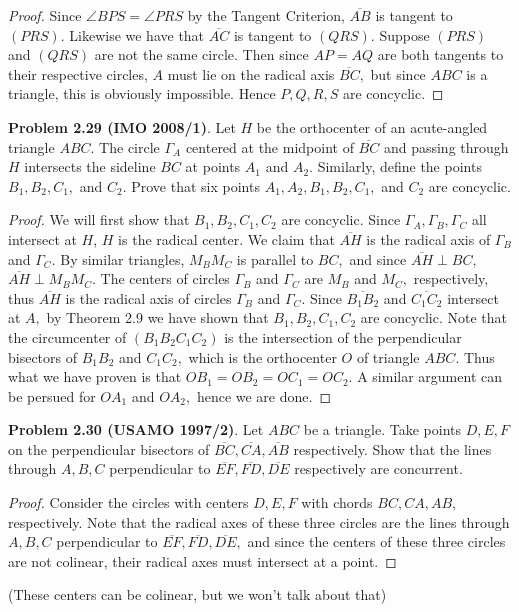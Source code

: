 \documentclass[letterpaper,oneside]{book}
\begin{document}
  \begin{proof}  Since $\angle BPS = \angle PRS$ by the Tangent Criterion, $\overline{AB}$ is tangent to $(PRS).$ Likewise we have that $\overline{AC}$ is tangent to $(QRS).$ Suppose $(PRS)$ and $(QRS)$ are not the same circle. Then since $AP=AQ$ are both tangents to their respective circles, $A$ must lie on the radical axis $\overline{BC},$ but since $ABC$ is a triangle, this is obviously impossible. Hence $P,Q,R,S$ are concyclic. \end{proof}

  

  \textbf{Problem 2.29 (IMO 2008/1)}.   Let $H$ be the orthocenter of an acute-angled triangle $ABC.$ The circle $\Gamma_A$ centered at the midpoint of $\overline{BC}$ and passing through $H$ intersects the sideline $BC$ at points $A_1$ and $A_2.$ Similarly, define the points $B_1, B_2, C_1,$ and $C_2.$ Prove that six points $A_1, A_2, B_1, B_2, C_1,$ and $C_2$ are concyclic.

  \begin{proof}  We will first show that $B_1, B_2, C_1, C_2$ are concyclic. Since $\Gamma_A,\Gamma_B, \Gamma_C$ all intersect at $H$, $H$ is the radical center. We claim that $\overline{AH}$ is the radical axis of $\Gamma_B$ and $\Gamma_C.$ By similar triangles, $M_BM_C$ is parallel to $BC,$ and since $\overline{AH} \perp BC,$ $\overline{AH} \perp M_BM_C.$ The centers of circles $\Gamma_B$ and $\Gamma_C$ are $M_B$ and $M_C,$ respectively, thus $\overline{AH}$ is the radical axis of circles $\Gamma_B$ and $\Gamma_C.$ Since $\overline{B_1B_2}$ and $\overline{C_1C_2}$ intersect at $A,$ by Theorem 2.9 we have shown that $B_1, B_2,C_1,C_2$ are concyclic. Note that the circumcenter of $(B_1B_2C_1C_2)$ is the intersection of the perpendicular bisectors of $B_1B_2$ and $C_1C_2,$ which is the orthocenter $O$ of triangle $ABC.$ Thus what we have proven is that $OB_1 = OB_2 = OC_1 = OC_2.$ A similar argument can be persued for $OA_1$ and $OA_2,$ hence we are done. \end{proof}

  

  \textbf{Problem 2.30 (USAMO 1997/2)}.   Let $ABC$ be a triangle. Take points $D, E, F$ on the perpendicular bisectors of $\overline{BC}, \overline{CA}, \overline{AB}$ respectively. Show that the lines through $A, B, C$  perpendicular to $\overline{EF}, \overline{FD}, \overline{DE}$ respectively are concurrent.

  \begin{proof}  Consider the circles with centers $D,E,F$ with chords $BC, CA, AB,$ respectively. Note that the radical axes of these three circles are the lines through $A,B,C$ perpendicular to $\overline{EF}, \overline{FD}, \overline{DE},$ and since the centers of these three circles are not colinear, their radical axes must intersect at a point. \end{proof} (These centers  can  be colinear, but we won't talk about that)
\end{document}
